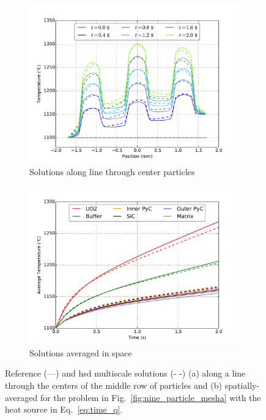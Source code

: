 \begin{figure}[!h]
\centering
\begin{subfigure}[b]{0.49\linewidth}
\centering
\includegraphics[width=1.1\linewidth]{figs/nine_particle_center_row_transient.png}
\caption{Solutions along line through center particles}
\label{fig:time_q}
\end{subfigure}
\begin{subfigure}[b]{0.49\linewidth}
\centering
\includegraphics[width=1.1\linewidth]{figs/nine_particle_transient_postprocessors.png}
\caption{Solutions averaged in space}
\label{fig:avg_nine}
\end{subfigure}
\caption{Reference (---) and \gls{hsd} multiscale solutions (- -) (a) along a line through the centers of the middle row of particles and (b) spatially-averaged for the problem in Fig.\ \ref{fig:nine_particle_mesha} with the heat source in Eq.\ \eqref{eq:time_q}.}
\end{figure}

